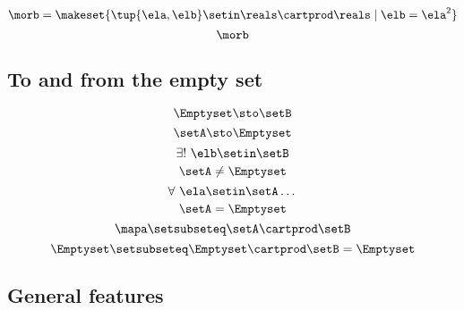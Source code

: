 {\begin{forslides}
        \begin{equation}
            \label{eq:slides_session2_113a}
            \morb = \makeset{\tup{\ela, \elb} \setin \reals \cartprod \reals \mid \elb = \ela^2}
        \end{equation}
        \begin{equation}
            \label{eq:slides_session2_113b}
            \morb
        \end{equation}

        \subsection{To and from the empty set}

        \begin{equation}
            \label{eq:slides_session2_114}
            \Emptyset \sto \setB
        \end{equation}
        \begin{equation}
            \label{eq:slides_session2_115}
            \setA \sto \Emptyset
        \end{equation}
        \begin{equation}
            \label{eq:slides_session2_116}
            \exists ! \ \elb \setin\setB
        \end{equation}
        \begin{equation}
            \label{eq:slides_session2_117}
            \setA \neq \Emptyset
        \end{equation}
        \begin{equation}
            \label{eq:slides_session2_118}
            \forall \ \ela \setin\setA \dots
        \end{equation}
        \begin{equation}
            \label{eq:slides_session2_119}
            \setA = \Emptyset
        \end{equation}
        \begin{equation}
            \label{eq:slides_session2_120}
            \mapa \setsubseteq \setA \cartprod \setB
        \end{equation}
        \begin{equation}
            \label{eq:slides_session2_121}
            \Emptyset \setsubseteq \Emptyset \cartprod \setB = \Emptyset
        \end{equation}

        \subsection{General features}


\end{forslides}}
